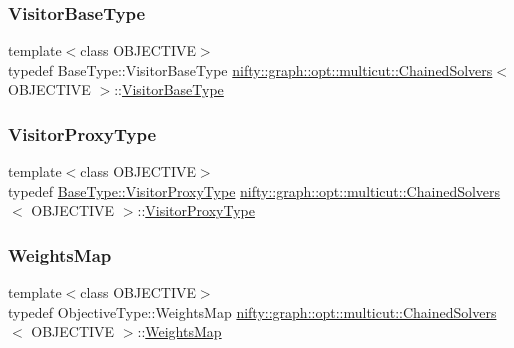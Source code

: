 \subsubsection{\texorpdfstring{Visitor\+Base\+Type}{VisitorBaseType}}
{\footnotesize\ttfamily template$<$class O\+B\+J\+E\+C\+T\+I\+VE$>$ \\
typedef Base\+Type\+::\+Visitor\+Base\+Type \hyperlink{classnifty_1_1graph_1_1opt_1_1multicut_1_1ChainedSolvers}{nifty\+::graph\+::opt\+::multicut\+::\+Chained\+Solvers}$<$ O\+B\+J\+E\+C\+T\+I\+VE $>$\+::\hyperlink{classnifty_1_1graph_1_1opt_1_1multicut_1_1ChainedSolvers_a2023073333edc978eca4a4fb8d06ae1b}{Visitor\+Base\+Type}}

\mbox{\label{classnifty_1_1graph_1_1opt_1_1multicut_1_1ChainedSolvers_ab39284cac6a5643faf84dcc32c84ddc5}} 
\subsubsection{\texorpdfstring{Visitor\+Proxy\+Type}{VisitorProxyType}}
{\footnotesize\ttfamily template$<$class O\+B\+J\+E\+C\+T\+I\+VE$>$ \\
typedef \hyperlink{classnifty_1_1graph_1_1opt_1_1common_1_1SolverBase_ad209b469b3bc9fc0fc14e9fed4d09075}{Base\+Type\+::\+Visitor\+Proxy\+Type} \hyperlink{classnifty_1_1graph_1_1opt_1_1multicut_1_1ChainedSolvers}{nifty\+::graph\+::opt\+::multicut\+::\+Chained\+Solvers}$<$ O\+B\+J\+E\+C\+T\+I\+VE $>$\+::\hyperlink{classnifty_1_1graph_1_1opt_1_1multicut_1_1ChainedSolvers_ab39284cac6a5643faf84dcc32c84ddc5}{Visitor\+Proxy\+Type}}

\mbox{\label{classnifty_1_1graph_1_1opt_1_1multicut_1_1ChainedSolvers_a0537810b1e7da59cf3ea803ddab4afef}} 
\subsubsection{\texorpdfstring{Weights\+Map}{WeightsMap}}
{\footnotesize\ttfamily template$<$class O\+B\+J\+E\+C\+T\+I\+VE$>$ \\
typedef Objective\+Type\+::\+Weights\+Map \hyperlink{classnifty_1_1graph_1_1opt_1_1multicut_1_1ChainedSolvers}{nifty\+::graph\+::opt\+::multicut\+::\+Chained\+Solvers}$<$ O\+B\+J\+E\+C\+T\+I\+VE $>$\+::\hyperlink{classnifty_1_1graph_1_1opt_1_1multicut_1_1ChainedSolvers_a0537810b1e7da59cf3ea803ddab4afef}{Weights\+Map}}

